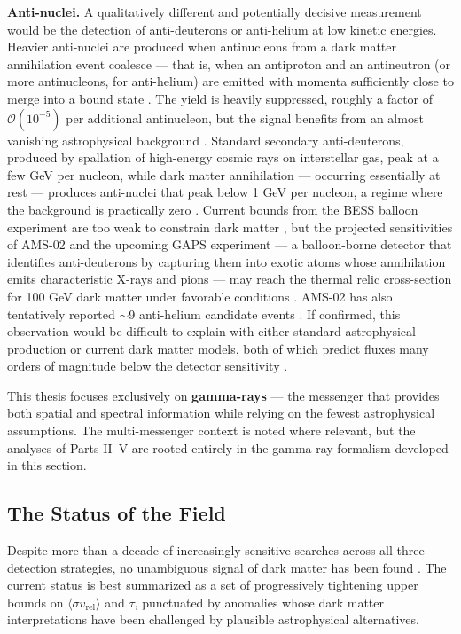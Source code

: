 \textbf{Anti-nuclei.}
A qualitatively different and potentially decisive measurement would be the detection of anti-deuterons or anti-helium at low kinetic energies.
Heavier anti-nuclei are produced when antinucleons from a dark matter annihilation event coalesce --- that is, when an antiproton and an antineutron (or more antinucleons, for anti-helium) are emitted with momenta sufficiently close to merge into a bound state \cite{Cirelli:2024ssz}.
The yield is heavily suppressed, roughly a factor of $\mathcal{O}(10^{-5})$ per additional antinucleon, but the signal benefits from an almost vanishing astrophysical background \cite{Cirelli:2024ssz}.
Standard secondary anti-deuterons, produced by spallation of high-energy cosmic rays on interstellar gas, peak at a few GeV per nucleon, while dark matter annihilation --- occurring essentially at rest --- produces anti-nuclei that peak below 1 GeV per nucleon, a regime where the background is practically zero \cite{Cirelli:2024ssz,Hooper:2024}.
Current bounds from the BESS balloon experiment are too weak to constrain dark matter \cite{Cirelli:2024ssz}, but the projected sensitivities of AMS-02 and the upcoming GAPS experiment --- a balloon-borne detector that identifies anti-deuterons by capturing them into exotic atoms whose annihilation emits characteristic X-rays and pions --- may reach the thermal relic cross-section for 100 GeV dark matter under favorable conditions \cite{Cirelli:2024ssz}.
AMS-02 has also tentatively reported $\sim$9 anti-helium candidate events \cite{Cirelli:2024ssz}.
If confirmed, this observation would be difficult to explain with either standard astrophysical production or current dark matter models, both of which predict fluxes many orders of magnitude below the detector sensitivity \cite{Cirelli:2024ssz}.

This thesis focuses exclusively on \textbf{gamma-rays} --- the messenger that provides both spatial and spectral information while relying on the fewest astrophysical assumptions.
The multi-messenger context is noted where relevant, but the analyses of Parts II--V are rooted entirely in the gamma-ray formalism developed in this section.

\subsection{The Status of the Field}
\label{sec:status}

Despite more than a decade of increasingly sensitive searches across all three detection strategies, no unambiguous signal of dark matter has been found \cite{Cirelli:2024ssz}.
The current status is best summarized as a set of progressively tightening upper bounds on $\langle \sigma v_\text{rel} \rangle$ and $\tau$, punctuated by anomalies whose dark matter interpretations have been challenged by plausible astrophysical alternatives.


